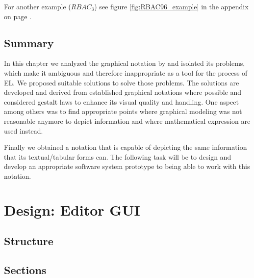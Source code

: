 \documentclass[twoside, openright, 12pt]{book}
\begin{document}
For another example ($RBAC_3$) see figure \ref{fig:RBAC96_example} in the appendix on page \pageref{fig:RBAC96_example}.




\section{Summary}
\label{gsl_summary}
In this chapter we analyzed the graphical notation by \cite{Amthor18} and isolated its problems, which make it ambiguous and therefore inappropriate as a tool for the process of EL.
We proposed suitable solutions to solve those problems.
The solutions are developed and derived from established graphical notations where possible and considered gestalt laws to enhance its visual quality and handling.
One aspect among others was to find appropriate points where graphical modeling was not reasonable anymore to depict information and where mathematical expression are used instead.

Finally we obtained a notation that is capable of depicting the same information that its textual/tabular forms can.
The following task will be to design and develop an appropriate software system prototype to being able to work with this notation.



\cleardoublepage
\chapter{Design: Editor GUI}
\label{editor_design}


\section{Structure}
\label{editor_structure}

\section{Sections}
\label{editor_sections}
\end{document}
